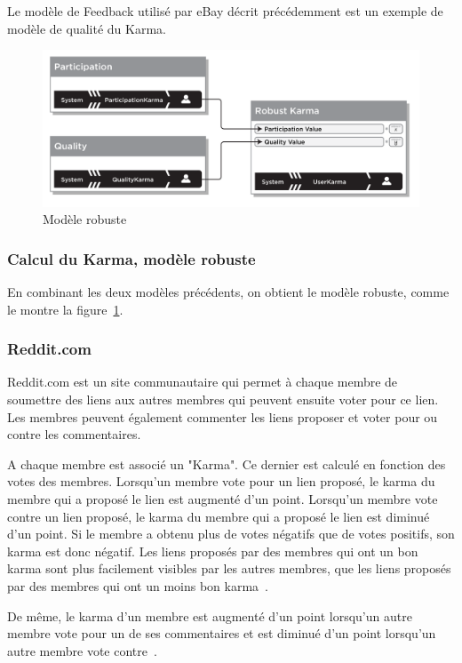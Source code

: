 \documentclass[a4paper, 11pt]{article} %
\begin{document}
Le modèle de Feedback utilisé par eBay décrit précédemment est un exemple de modèle de qualité du Karma.

\begin{figure}
	\begin{center}
		\includegraphics[width=12cm]{karma.png} 
	\end{center}
	\caption{Modèle robuste~\cite{FarmerGlass2010}}
	\label{robusteKarma}
\end{figure}

\subsubsection{Calcul du Karma, modèle robuste}
En combinant les deux modèles précédents, on obtient le modèle robuste, comme le montre la figure~\ref{robusteKarma}. 

\subsubsection{Reddit.com}
Reddit.com est un site communautaire qui permet à chaque membre de soumettre des liens aux autres membres qui peuvent ensuite voter pour ce lien. Les membres peuvent également commenter les liens proposer et voter pour ou contre les commentaires.

A chaque membre est associé un "Karma". Ce dernier est calculé en fonction des votes des membres. Lorsqu'un membre vote pour un lien proposé, le karma du membre qui a proposé le lien est augmenté d'un point. Lorsqu'un membre vote contre un lien proposé, le karma du membre qui a proposé le lien est diminué d'un point. Si le membre a obtenu plus de votes négatifs que de votes positifs, son karma est donc négatif. Les liens proposés par des membres qui ont un bon karma sont plus facilement visibles par les autres membres, que les liens proposés par des membres qui ont un moins bon karma~\cite{RedditTroll}.

De même, le karma d'un membre est augmenté d'un point lorsqu'un autre membre vote pour un de ses commentaires et est diminué d'un point lorsqu'un autre membre vote contre~\cite{RedditTroll}.
\end{document}
